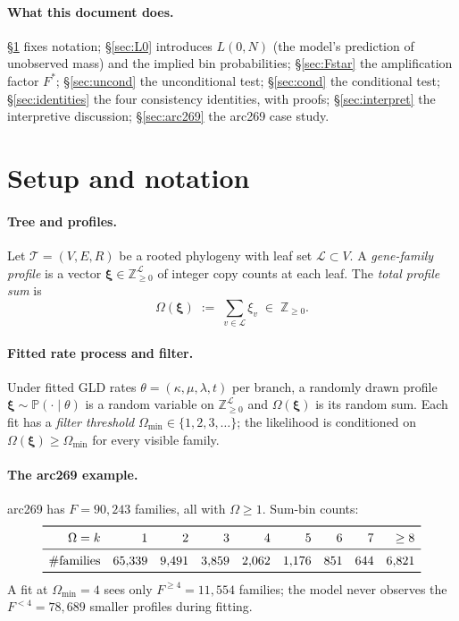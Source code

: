 \documentclass[11pt]{article}
\newcommand{\Z}{\mathbb{Z}}
\newcommand{\PROB}{\mathbb{P}}
\newcommand{\1}{\mathbf{1}}
\newcommand{\Tree}{\mathcal{T}}
\newcommand{\Leaves}{\mathcal{L}}
\newcommand{\troot}{R}
\newcommand{\Prof}{\boldsymbol{\xi}}
\newcommand{\Om}{\Omega}
\newcommand{\rate}{\kappa}
\newcommand{\dup}{\lambda}
\newcommand{\loss}{\mu}
\newcommand{\edgelen}{t}
\theoremstyle{definition}
\begin{document}
\paragraph{What this document does.}
\S\ref{sec:setup} fixes notation; \S\ref{sec:L0} introduces $L(0,N)$
(the model's prediction of unobserved mass) and the implied bin
probabilities; \S\ref{sec:Fstar} the amplification factor $F^*$;
\S\ref{sec:uncond} the unconditional test; \S\ref{sec:cond} the
conditional test; \S\ref{sec:identities} the four consistency
identities, with proofs; \S\ref{sec:interpret} the interpretive
discussion; \S\ref{sec:arc269} the arc269 case study.

\section{Setup and notation}
\label{sec:setup}

\paragraph{Tree and profiles.}
Let $\Tree = (V, E, \troot)$ be a rooted phylogeny with leaf set
$\Leaves \subset V$. A \emph{gene-family profile} is a vector
$\Prof \in \Z_{\ge 0}^\Leaves$ of integer copy counts at each leaf.
The \emph{total profile sum} is
\begin{equation}
\Om(\Prof) \;:=\; \sum_{v \in \Leaves} \xi_v \;\in\; \Z_{\ge 0}.
\label{eq:omega-def}
\end{equation}

\paragraph{Fitted rate process and filter.}
Under fitted GLD rates $\theta = (\rate, \loss, \dup, \edgelen)$ per
branch, a randomly drawn profile $\Prof \sim \PROB(\cdot \mid \theta)$
is a random variable on $\Z_{\ge 0}^\Leaves$ and $\Om(\Prof)$ is its
random sum. Each fit has a \emph{filter threshold}
$\Om_{\min} \in \{1, 2, 3, \dots\}$; the likelihood is conditioned on
$\Om(\Prof) \ge \Om_{\min}$ for every visible family.

\paragraph{The arc269 example.}
arc269 has $F = 90{,}243$ families, all with $\Om \ge 1$. Sum-bin
counts:
\[
\renewcommand{\arraystretch}{1.1}
\begin{array}{rrrrrrrrr}
\toprule
\Om = k         & 1     & 2     & 3     & 4     & 5     & 6     & 7     & \ge 8 \\
\midrule
\#\text{families} & 65{,}339 & 9{,}491 & 3{,}859 & 2{,}062 & 1{,}176 & 851 & 644 & 6{,}821 \\
\bottomrule
\end{array}
\]
A fit at $\Om_{\min} = 4$ sees only $F^{\ge 4} = 11{,}554$ families;
the model never observes the $F^{<4} = 78{,}689$ smaller profiles
during fitting.
\end{document}
